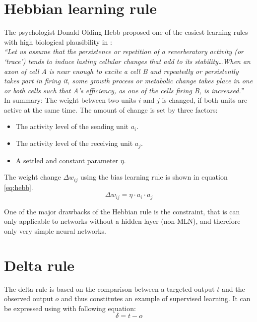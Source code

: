 \documentclass[10pt,a4paper,DIV=11]{scrreprt}
\begin{document}
\section{Hebbian learning rule}
The psychologist Donald Olding Hebb proposed one of the easiest learning rules with high biological plausibility in \cite{HEBB}:\\
\textit{“Let us assume that the persistence or repetition of a reverberatory activity (or ‘trace’) tends to induce lasting cellular changes that 
add to its stability\dots When an axon of cell A is near enough to excite a cell B and repeatedly or persistently takes part in firing it, some 
growth process or metabolic change takes place in one or both cells such that A's efficiency, as one of the cells firing B, is increased.”}\\

In summary: The weight between two units $i$ and $j$ is changed, if both units are active at the same time. The amount of change is set by three 
factors:

\begin{itemize}
\item The activity level of the sending unit $a_i$.
\item The activity level of the receiving unit $a_j$.
\item A settled and constant parameter $\eta$.
\end{itemize}

The weight change $\Delta w_{ij}$ using the bias learning rule is shown in equation \eqref{eq:hebb}.
\begin{equation}
\Delta w_{ij} = \eta \cdot a_i \cdot a_j
\label{eq:hebb}
\end{equation}

One of the major drawbacks of the Hebbian rule is the constraint, that is can only applicable to networks without a hidden layer (non-MLN), 
and therefore only very simple neural networks.

\section{Delta rule}
The delta rule is based on the comparison between a targeted output $t$ and the observed output $o$ and thus constitutes an example of 
supervised learning. It can be expressed using with following equation:
\begin{equation}
\delta = t - o
\end{equation}
\end{document}
